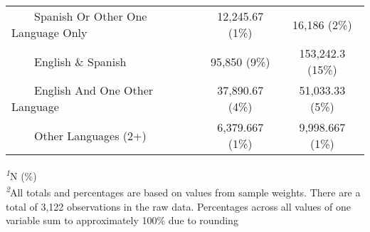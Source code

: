 \begin{table}[t]
\begin{tabular*}{\linewidth}{@{\extracolsep{\fill}}lcc}
    Spanish Or Other One Language Only & 12,245.67 (1\%)  & 16,186 (2\%)  \\ 
    English \& Spanish & 95,850 (9\%)  & 153,242.3 (15\%)  \\ 
    English And One Other Language & 37,890.67 (4\%)  & 51,033.33 (5\%)  \\ 
    Other Languages (2+) & 6,379.667 (1\%)  & 9,998.667 (1\%)  \\ 
\bottomrule
\end{tabular*}
\begin{minipage}{\linewidth}
\textsuperscript{\textit{1}}N (\%)\\
\textsuperscript{\textit{2}}All totals and percentages are based on values from sample weights. There are a total of 3,122 observations in the raw data. Percentages across all values of one variable sum to approximately 100\% due to rounding\\
\end{minipage}
\end{table}

